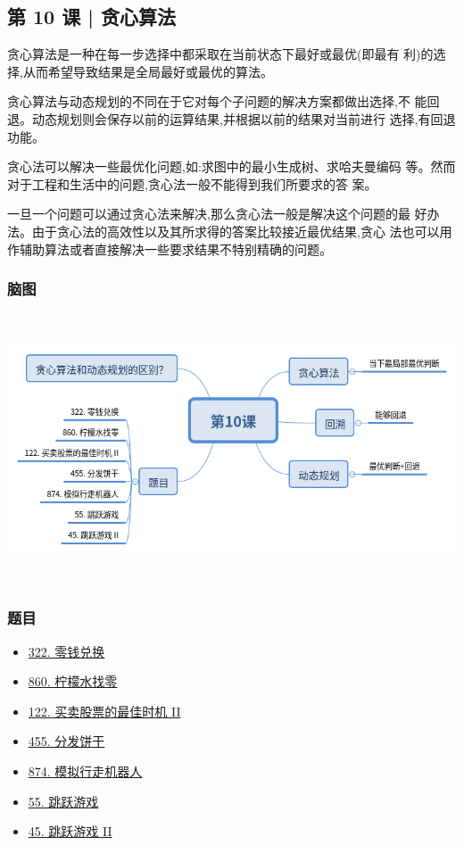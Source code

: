 \subsection{第 10 课 | 贪心算法}

贪心算法是一种在每一步选择中都采取在当前状态下最好或最优(即最有
利)的选择,从而希望导致结果是全局最好或最优的算法。

贪心算法与动态规划的不同在于它对每个子问题的解决方案都做出选择,不
能回退。动态规划则会保存以前的运算结果,并根据以前的结果对当前进行
选择,有回退功能。

贪心法可以解决一些最优化问题,如:求图中的最小生成树、求哈夫曼编码
等。然而对于工程和生活中的问题,贪心法一般不能得到我们所要求的答
案。

一旦一个问题可以通过贪心法来解决,那么贪心法一般是解决这个问题的最
好办法。由于贪心法的高效性以及其所求得的答案比较接近最优结果,贪心
法也可以用作辅助算法或者直接解决一些要求结果不特别精确的问题。

\subsubsection{脑图}

\includegraphics[width=170mm,height=80mm]{images/第10课.png}

\subsubsection{题目}

\begin{itemize}
  \item \hyperref[leetcode:322]{322. 零钱兑换}
  \item \hyperref[leetcode:860]{860. 柠檬水找零}
  \item \hyperref[leetcode:122]{122. 买卖股票的最佳时机 II}
  \item \hyperref[leetcode:455]{455. 分发饼干}
  \item \hyperref[leetcode:874]{874. 模拟行走机器人}
  \item \hyperref[leetcode:55]{55. 跳跃游戏}
  \item \hyperref[leetcode:45]{45. 跳跃游戏 II}
\end{itemize}
